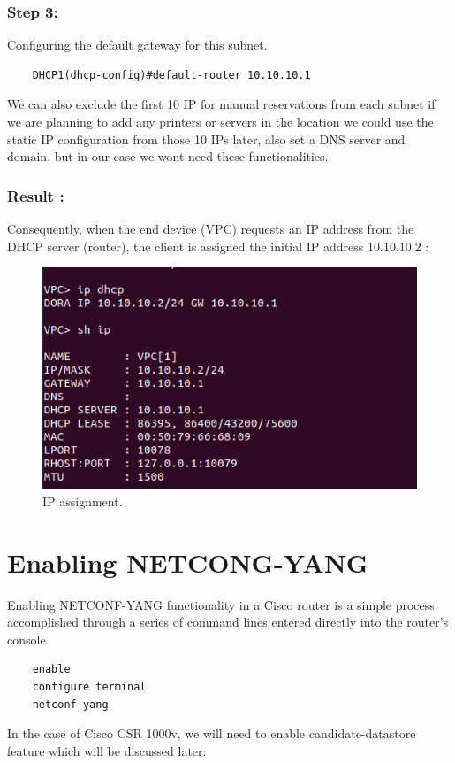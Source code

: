 \subsubsection{Step 3:}
Configuring the default gateway for this subnet.
\begin{verbatim}
    DHCP1(dhcp-config)#default-router 10.10.10.1
\end{verbatim}
We can also exclude the first 10 IP for manual reservations from each subnet if we are planning to add any printers or servers in the location we could use the static IP configuration from those 10 IPs later, also set a DNS server and domain, but in our case we wont need these functionalities.

\subsubsection{Result :}
Consequently, when the end device (VPC) requests an IP address from the DHCP server (router), the client is assigned the initial IP address 10.10.10.2 :
\begin{figure}[h]
    \centering
    \includegraphics[width=0.7\linewidth]{Images/VPC_dhcp.png}
    \caption{IP assignment.}
\end{figure}

\section{Enabling NETCONG-YANG}

Enabling NETCONF-YANG functionality in a Cisco router is a simple process accomplished through a series of command lines entered directly into the router's console.

\begin{verbatim}
    enable 
    configure terminal
    netconf-yang
\end{verbatim}

In the case of Cisco CSR 1000v, we will need to enable candidate-datastore feature which will be discussed later:

